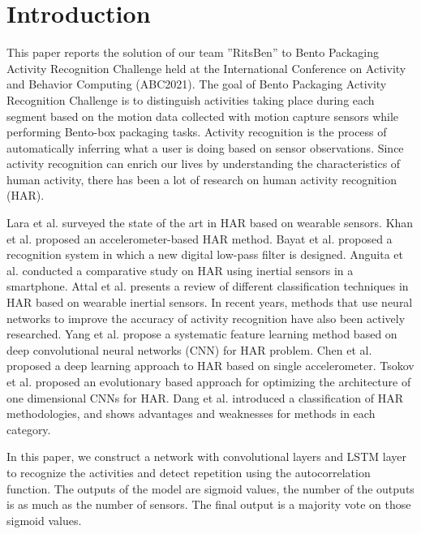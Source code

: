 \documentclass[graybox]{svmult}
\begin{document}
\section{Introduction}
\label{sec:introduction}
This paper reports the solution of our team ''RitsBen'' to Bento Packaging Activity Recognition Challenge held at the International Conference on Activity and Behavior Computing (ABC2021). The goal of Bento Packaging Activity Recognition Challenge is to distinguish activities taking place during each segment based on the motion data collected with motion capture sensors while performing Bento-box packaging tasks. Activity recognition is the process of automatically inferring what a user is doing based on sensor observations. Since activity recognition can enrich our lives by understanding the characteristics of human activity, there has been a lot of research on human activity recognition (HAR).\par

Lara et al. \cite{lara2012survey} surveyed  the state of the art in HAR based on wearable sensors.
Khan et al. \cite{khan2010triaxial} proposed an accelerometer-based HAR method.
Bayat et al. \cite{bayat2014study} proposed a recognition system in which a new digital low-pass filter is designed.
Anguita et al. \cite{anguita2012human} conducted a comparative study on HAR using inertial sensors in a smartphone.
Attal et al. \cite{attal2015physical} presents a review of different classification techniques in HAR based on wearable inertial sensors.
In recent years, methods that use neural networks to improve the accuracy of activity recognition have also been actively researched.
Yang et al. \cite{yang2015deep} propose a systematic feature learning method based on deep convolutional neural networks (CNN) for HAR problem.
Chen et al. \cite{chen2015deep} proposed a deep learning approach to HAR based on single accelerometer. 
Tsokov et al. \cite{tsokov2021evolutionary} proposed an evolutionary based approach for optimizing the architecture of one dimensional CNNs for HAR.
Dang et al. \cite{dang2020sensor} introduced a classification of HAR methodologies, and shows advantages and weaknesses for methods in each category.\par

In this paper, we construct a network with convolutional layers and LSTM layer to recognize the activities and detect repetition using the autocorrelation function. The outputs of the model are sigmoid values, the number of the outputs is as much as the number of sensors. The final output is a majority vote on those sigmoid values.
\end{document}

